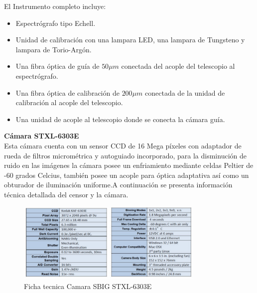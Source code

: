 \noindent El Instrumento completo incluye:

\begin{itemize}
    \item Espectrógrafo tipo Echell.
    \item Unidad de calibración con una lampara LED, una lampara de  Tungsteno y lampara de Torio-Argón.
    \item Una fibra óptica de guía de $50 \mu m$ conectada del acople del telescopio al espectrógrafo.
    \item Una fibra óptica de calibración de $200 \mu m$ conectada de la unidad de calibración al acople del telescopio.
    \item Una unidad de acople al telescopio donde se conecta la cámara guía.
\end{itemize}{}



\noindent \textbf{Cámara STXL-6303E }\\

Esta cámara cuenta con un sensor CCD de 16 Mega píxeles con adaptador de rueda de filtros micrométrica y autoguiado incorporado, para la disminución de ruido en las imágenes la cámara posee un enfriamiento mediante celdas Peltier de -60 grados Celcius, también posee un acople para óptica adaptativa así como un obturador de iluminación uniforme.A continuación se presenta información técnica detallada del censor y la cámara.

\begin{figure}[htb!]
\centering
\includegraphics[width=0.8\textwidth]{images/7.png}
\caption[Espectro continuo.]{Ficha tecnica Camara SBIG STXL-6303E\cite{gra7}}
 \label{fig2}
\end{figure}


